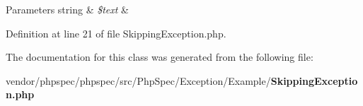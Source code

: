 \begin{DoxyParams}[1]{Parameters}
string & {\em \$text} & \\
\hline
\end{DoxyParams}


Definition at line 21 of file Skipping\+Exception.\+php.



The documentation for this class was generated from the following file\+:\begin{DoxyCompactItemize}
\item 
vendor/phpspec/phpspec/src/\+Php\+Spec/\+Exception/\+Example/{\bf Skipping\+Exception.\+php}\end{DoxyCompactItemize}

